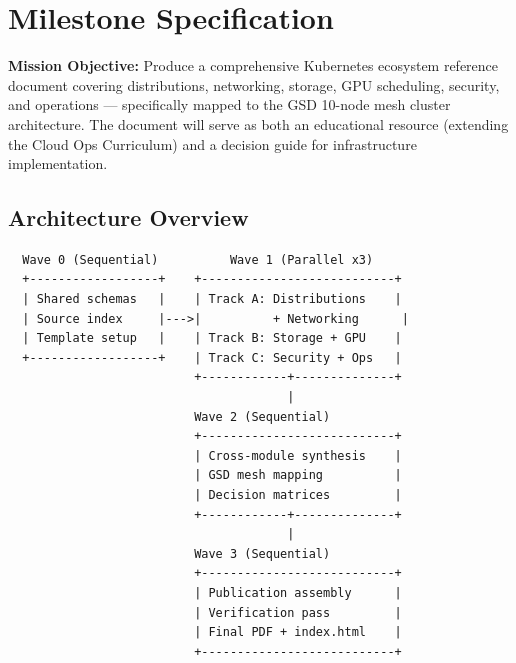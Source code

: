 \documentclass[11pt,letterpaper]{article}
\newcommand{\stageheader}[2]{%
  \noindent\colorbox{#2}{\makebox[\textwidth][l]{%
    \textcolor{white}{\bfseries\sffamily\hspace{6pt}#1\hspace{6pt}}}}%
  \vspace{0.5em}\par%
}
\newcommand{\metafield}[2]{\textbf{\sffamily #1} #2\par}
\begin{document}
\newpage

\stageheader{STAGE 3 --- MISSION PACKAGE}{tertiary}

\section{Milestone Specification}

\metafield{Mission Objective:}{Produce a comprehensive Kubernetes ecosystem reference document covering distributions, networking, storage, GPU scheduling, security, and operations --- specifically mapped to the GSD 10-node mesh cluster architecture. The document will serve as both an educational resource (extending the Cloud Ops Curriculum) and a decision guide for infrastructure implementation.}

\subsection{Architecture Overview}

\begin{asciibox}
\begin{verbatim}
  Wave 0 (Sequential)          Wave 1 (Parallel x3)
  +------------------+    +---------------------------+
  | Shared schemas   |    | Track A: Distributions    |
  | Source index     |--->|          + Networking      |
  | Template setup   |    | Track B: Storage + GPU    |
  +------------------+    | Track C: Security + Ops   |
                          +------------+--------------+
                                       |
                          Wave 2 (Sequential)
                          +---------------------------+
                          | Cross-module synthesis    |
                          | GSD mesh mapping          |
                          | Decision matrices         |
                          +------------+--------------+
                                       |
                          Wave 3 (Sequential)
                          +---------------------------+
                          | Publication assembly      |
                          | Verification pass         |
                          | Final PDF + index.html    |
                          +---------------------------+
\end{verbatim}
\end{asciibox}
\end{document}
